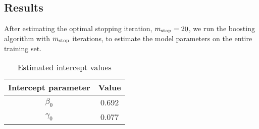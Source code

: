 \subsection{Results}
After estimating the optimal stopping iteration, $m_{\text{stop}}=20$, we run the boosting algorithm with $m_{\text{stop}}$ iterations, to estimate the model parameters on the entire training set.

\begin{table}
\caption{Estimated intercept values}
\label{tab:neuroblastoma-intercepts}
\centering
\begin{tabular}{cc}
\toprule
Intercept parameter & Value\\
\hline
$\beta_0$ & 0.692 \\
$\gamma_0$ & 0.077 \\
\bottomrule
\end{tabular}
\end{table}

